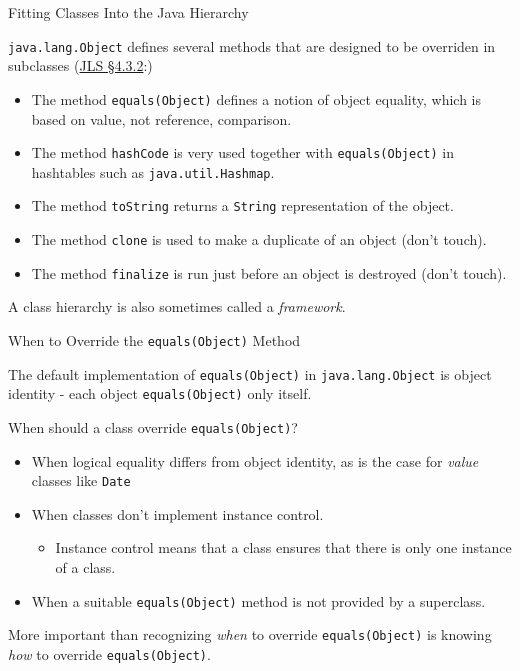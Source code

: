 \documentclass{beamer}
\begin{document}
\begin{frame}
  \titlepage
\end{frame}

\begin{frame}[fragile]{Fitting Classes Into the Java Hierarchy}


{\tt java.lang.Object} defines several methods that are designed to be overriden in subclasses (\href{http://docs.oracle.com/javase/specs/jls/se7/html/jls-4.html#jls-4.3.2}{JLS \S 4.3.2}:)
\begin{itemize}
\item The method {\tt equals(Object)} defines a notion of object equality, which is based on value, not reference, comparison.
\item The method {\tt hashCode} is very used together with  {\tt equals(Object)} in hashtables such as {\tt java.util.Hashmap}.
\item The method {\tt toString} returns a {\tt String} representation of the object.
\item The method {\tt clone} is used to make a duplicate of an object (don't touch).
\item The method {\tt finalize} is run just before an object is destroyed (don't touch).
\end{itemize}

A class hierarchy is also sometimes called a {\it framework}.

\end{frame}


\begin{frame}[fragile]{When to Override the {\tt equals(Object)} Method}


The default implementation of {\tt equals(Object)} in {\tt java.lang.Object} is object identity - each object {\tt equals(Object)} only itself.

When should a class override {\tt equals(Object)}?
\begin{itemize}
\item When logical equality differs from object identity, as is the case for {\it value} classes like {\tt Date}
\item When classes don't implement instance control.
  \begin{itemize}
  \item Instance control means that a class ensures that there is only one instance of a class.
  \end{itemize}
\item When a suitable {\tt equals(Object)} method is not provided by a superclass.
\end{itemize}

More important than recognizing {\it when} to override {\tt equals(Object)} is knowing {\it how} to override {\tt equals(Object)}.
\end{frame}
\end{document}
